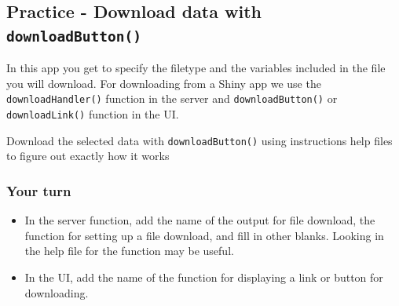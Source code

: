 \documentclass[
  letterpaper,
  DIV=11,
  numbers=noendperiod]{scrreprt}
\newenvironment{Shaded}{\begin{snugshade}}{\end{snugshade}}
\newcommand{\AttributeTok}[1]{\textcolor[rgb]{0.40,0.46,0.14}{#1}}
\newcommand{\CommentTok}[1]{\textcolor[rgb]{0.37,0.37,0.37}{#1}}
\newcommand{\ConstantTok}[1]{\textcolor[rgb]{0.56,0.35,0.01}{#1}}
\newcommand{\DecValTok}[1]{\textcolor[rgb]{0.68,0.00,0.00}{#1}}
\newcommand{\FunctionTok}[1]{\textcolor[rgb]{0.28,0.35,0.67}{#1}}
\newcommand{\NormalTok}[1]{\textcolor[rgb]{0.00,0.46,0.62}{#1}}
\newcommand{\OtherTok}[1]{\textcolor[rgb]{0.00,0.46,0.62}{#1}}
\newcommand{\SpecialCharTok}[1]{\textcolor[rgb]{0.37,0.37,0.37}{#1}}
\providecommand{\tightlist}{%
  \setlength{\itemsep}{0pt}\setlength{\parskip}{0pt}}
\begin{document}
\begin{Shaded}
\end{Shaded}

\hypertarget{practice---download-data-with-downloadbutton}{%
\subsection{\texorpdfstring{Practice - Download data with
\texttt{downloadButton()}}{Practice - Download data with downloadButton()}}\label{practice---download-data-with-downloadbutton}}

In this app you get to specify the filetype and the variables included
in the file you will download. For downloading from a Shiny app we use
the \texttt{downloadHandler()} function in the server and
\texttt{downloadButton()} or \texttt{downloadLink()} function in the UI.

Download the selected data with \texttt{downloadButton()} using
instructions help files to figure out exactly how it works

\hypertarget{your-turn-19}{%
\subsubsection{Your turn}\label{your-turn-19}}

\begin{itemize}
\tightlist
\item
  In the server function, add the name of the output for file download,
  the function for setting up a file download, and fill in other blanks.
  Looking in the help file for the function may be useful.
\item
  In the UI, add the name of the function for displaying a link or
  button for downloading.
\end{itemize}
\end{document}
